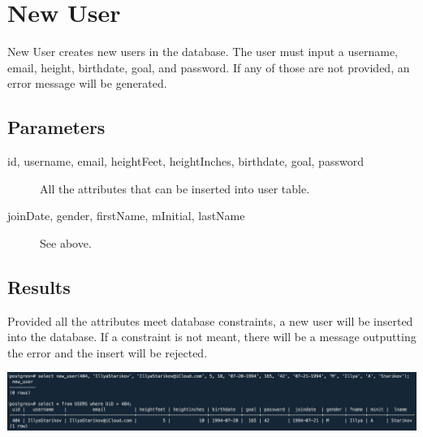 \section{New User}
New User creates new users in the database. The user must input a username, email, height, birthdate, goal, and password. If any of those are not provided, an error message will be generated.

\subsection*{Parameters}
\begin{description}
    \item [id, username, email, heightFeet, heightInches, birthdate, goal, password] All the attributes that can be inserted into user table.
    \item [joinDate, gender, firstName, mInitial, lastName] See above.
\end{description}

\subsection*{Results}
Provided all the attributes meet database constraints, a new user will be inserted into the database. If a constraint is not meant, there will be a message outputting the error and the insert will be rejected.

\begin{center}
\includegraphics[width=\columnwidth]{include/assets/screenshots/new_user}
\end{center}